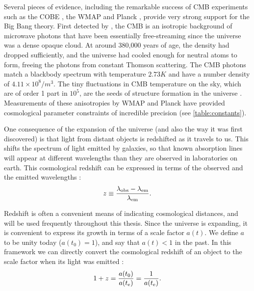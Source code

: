 Several pieces of evidence, including the remarkable success of \acf{CMB} experiments such as the \acf{COBE} \citep{COBE96}, the \acf{WMAP} \citep{WMAP9} and \acs{Planck} \citep{PlanckXVI}, provide very strong support for the Big Bang theory. First detected by \citet{PenziasWilson65}, the \ac{CMB} is an isotropic background of microwave photons that have been essentially free-streaming since the universe was a dense opaque cloud. At around 380,000 years of age, the density had dropped sufficiently, and the universe had cooled enough for neutral atoms to form, freeing the photons from constant Thomson scattering. The \ac{CMB} photons match a blackbody spectrum with temperature $2.73 K$ and have a number density of $4.11 \times 10^8 / m^3$. The tiny fluctuations in \ac{CMB} temperature on the sky, which are of order 1 part in $10^5$, are the seeds of structure formation in the universe \citep{RydenText}. Measurements of these anisotropies by \ac{WMAP} and \acs{Planck} have provided cosmological parameter constraints of incredible precision (see \autoref{table:constants}).

One consequence of the expansion of the universe (and also the way it was first discovered) is that light from distant objects is redshifted as it travels to us. This shifts the spectrum of light emitted by galaxies, so that known absorption lines will appear at different wavelengths than they are observed in laboratories on earth. This cosmological redshift can be expressed in terms of the observed and the emitted wavelengths \citep{RydenText}:
\begin{equation}
z \equiv \frac{\lambda_{\rm obs} - \lambda_{\rm em}}{\lambda_{\rm em}}.
\end{equation}

Redshift is often a convenient means of indicating cosmological distances, and will be used frequently throughout this thesis. Since the universe is expanding, it is convenient to express its growth in terms of a scale factor $a(t)$. We define $a$ to be unity today ($a(t_0)=1$), and say that $a(t)<1$ in the past. In this framework we can directly convert the cosmological redshift of an object to the scale factor when its light was emitted \citep{RydenText}:
\begin{equation}
1+z = \frac{a(t_0)}{a(t_{\rm e})} = \frac{1}{a(t_{\rm e})}.
\label{eq:z}
\end{equation}

